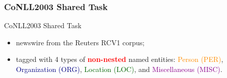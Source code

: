 \documentclass{beamer}
\begin{document}
\begin{frame}
\frametitle{CoNLL2003 Shared Task}
\begin{block}{CoNLL2003 Shared Task}
	\begin{itemize}
	\item newswire from the Reuters RCV1 corpus;
	\item tagged with 4 types of \textbf{\textcolor{red}{non-nested}} named entities: 
			\textcolor{darkorange}{Person (PER)}, 
			\textcolor{navy}{Organization (ORG)},
			\textcolor{darkgreen}{Location (LOC)}, and
			\textcolor{darkmagenta}{Miscellaneous (MISC)}.
	\end{itemize}
\end{block}
\begin{table}
    \centering
    \caption{\scriptsize Data distribution of CoNLL2003}
    \label{tbl:conll2003stat}
\end{table}
\end{frame}
\end{document}
